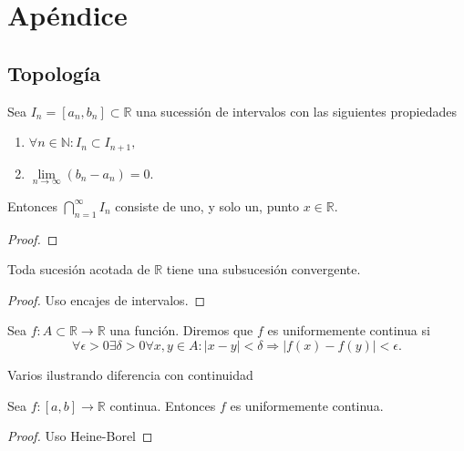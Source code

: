 \chapter*{Apéndice}

\section{Topología}

\begin{teorema}  Sea $I_n=[a_n,b_n]\subset\mathbb{R}$ una sucessión de intervalos con las siguientes propiedades
\begin{enumerate}
 \item $\forall n\in\mathbb{N}: I_n\subset I_{n+1},$
 \item $\lim\limits_{n\to\infty}(b_n-a_n)=0.$
\end{enumerate}
Entonces $\bigcap_{n=1}^{\infty}I_n$ consiste de uno, y solo un, punto $x\in\mathbb{R}$.
 
\end{teorema}

\begin{proof}
 
\end{proof}





\begin{teorema} Toda sucesión acotada de $\mathbb{R}$ 
tiene una subsucesión convergente.
 
\end{teorema}

\begin{proof} Uso encajes de intervalos.
 
\end{proof}


\begin{definicion} Sea $f:A\subset\mathbb{R}\to\mathbb{R}$ una función. Diremos que $f$ es uniformemente continua si 
\[
 \forall \epsilon>0\exists \delta>0 \forall x,y\in A:|x-y|<\delta\Rightarrow |f(x)-f(y)|<\epsilon.
 \]

\end{definicion}

\begin{ejemplo} Varios ilustrando diferencia con continuidad
 
\end{ejemplo}


\begin{teorema} Sea $f:[a,b]\to\mathbb{R}$ continua. Entonces $f$ es uniformemente continua. 
 \end{teorema}
\begin{proof} Uso Heine-Borel
 \end{proof}

